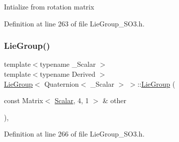 Intialize from rotation matrix 

Definition at line 263 of file Lie\+Group\+\_\+\+S\+O3.\+h.

\hypertarget{class_lie_group_3_01_quaternion_3_01___scalar_01_4_01_4_ada8f3063710d6ef0737a43f0a6f55af2}{}\label{class_lie_group_3_01_quaternion_3_01___scalar_01_4_01_4_ada8f3063710d6ef0737a43f0a6f55af2} 
\subsubsection{\texorpdfstring{Lie\+Group()}{LieGroup()}\hspace{0.1cm}{\footnotesize\ttfamily [7/9]}}
{\footnotesize\ttfamily template$<$typename \+\_\+\+Scalar $>$ \\
template$<$typename Derived $>$ \\
\hyperlink{class_lie_group}{Lie\+Group}$<$ Quaternion$<$ \+\_\+\+Scalar $>$ $>$\+::\hyperlink{class_lie_group}{Lie\+Group} (\begin{DoxyParamCaption}\item[{const Matrix$<$ \hyperlink{class_lie_group_3_01_quaternion_3_01___scalar_01_4_01_4_a5c9cc4f61c2a1870f44da7951225dc4e}{Scalar}, 4, 1 $>$ \&}]{other }\end{DoxyParamCaption})\hspace{0.3cm}{\ttfamily [inline]}, {\ttfamily [explicit]}}



Definition at line 266 of file Lie\+Group\+\_\+\+S\+O3.\+h.

\hypertarget{class_lie_group_3_01_quaternion_3_01___scalar_01_4_01_4_ae14ff68d6699e47d32bedc863725ce40}{}\label{class_lie_group_3_01_quaternion_3_01___scalar_01_4_01_4_ae14ff68d6699e47d32bedc863725ce40} 
